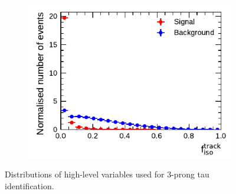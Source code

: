 \begin{figure}[htbp]
\begin{subfigure}{0.5\textwidth}
  \end{subfigure}%
  \begin{subfigure}{0.5\textwidth}
    \centering
    \includegraphics{./figures/baseline_bdt_vars/3p/SumPtTrkFrac.pdf}
  \end{subfigure}%
  \caption[Distributions of high-level variables used for 3-prong tau
  identification]{Distributions of high-level variables used for 3-prong tau
    identification.}
  \label{fig:bdt_vars_3p_overlays}
\end{figure}

